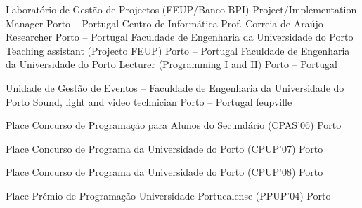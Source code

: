 \documentclass[11pt, a4paper]{awesome-cv}
\begin{document}
\begin{cventries}
  \cventry
  {Laboratório de Gestão de Projectos (FEUP/Banco BPI) }
  {Project/Implementation Manager}
  {Porto -- Portugal}
  {}
  {}
  \cventry
  {Centro de Informática Prof. Correia de Araújo}
  {Researcher}
  {Porto -- Portugal}
  {}
  {}
  \cventry
  {Faculdade de Engenharia da Universidade do Porto}
  {Teaching assistant (Projecto FEUP)}
  {Porto -- Portugal}
  {}
  {}
  \cventry
  {Faculdade de Engenharia da Universidade do Porto}
  {Lecturer (Programming I and II)}
  {Porto -- Portugal}
  {}
  {}
\end{cventries}

\begin{cventries}
  \cventry
  {Unidade de Gestão de Eventos -- Faculdade de Engenharia da Universidade do Porto}
  {Sound, light and video technician}
  {Porto -- Portugal}
  {}
  {
    feupville
  }
\end{cventries}
\begin{cvhonors}
  \cvhonor
  { Place}
  {Concurso de Programa\c{c}ão para Alunos do Secundário (CPAS'06)}
  {Porto}
  {}

  \cvhonor
  { Place}
  {Concurso de Programa da Universidade do Porto (CPUP'07)}
  {Porto}
  {}

  \cvhonor
  { Place}
  {Concurso de Programa da Universidade do Porto (CPUP'08)}
  {Porto}
  {}

  \cvhonor
  { Place}
  {Prémio de Programa\c{c}ão Universidade Portucalense (PPUP'04)}
  {Porto}
  {}
\end{cvhonors}
\end{document}
